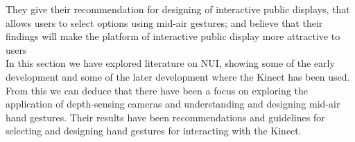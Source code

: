 They give their recommendation for designing of interactive public displays, that allows users to select options using mid-air gestures; and believe that their findings will make the platform of interactive public display more attractive to users
\\
In this section we have explored literature on NUI, showing some of the early development and some of the later development where the Kinect has been used. From this we can deduce that there have been a focus on exploring the application of depth-sensing cameras and understanding and designing mid-air hand gestures. Their results have been recommendations and guidelines for selecting and designing hand gestures for interacting with the Kinect.
